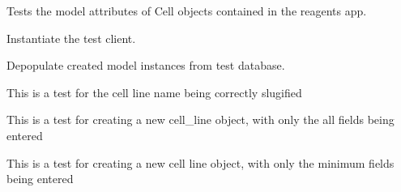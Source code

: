 \documentclass[letterpaper,10pt,english]{sphinxmanual}
\begin{document}

\begin{fulllineitems}
\label{api:experimentdb.reagents.tests.CellModelTests}
Tests the model attributes of Cell objects contained in the reagents app.

\begin{fulllineitems}
\label{api:experimentdb.reagents.tests.CellModelTests.setUp}
Instantiate the test client.

\end{fulllineitems}


\begin{fulllineitems}
\label{api:experimentdb.reagents.tests.CellModelTests.tearDown}
Depopulate created model instances from test database.

\end{fulllineitems}


\begin{fulllineitems}
\label{api:experimentdb.reagents.tests.CellModelTests.test_cell_line_slugify}
This is a test for the cell line name being correctly slugified

\end{fulllineitems}


\begin{fulllineitems}
\label{api:experimentdb.reagents.tests.CellModelTests.test_create_cell_line_all_fields}
This is a test for creating a new cell\_line object, with only the all fields being entered

\end{fulllineitems}


\begin{fulllineitems}
\label{api:experimentdb.reagents.tests.CellModelTests.test_create_cell_line_minimal}
This is a test for creating a new cell line object, with only the minimum fields being entered

\end{fulllineitems}


\end{fulllineitems}
\end{document}
